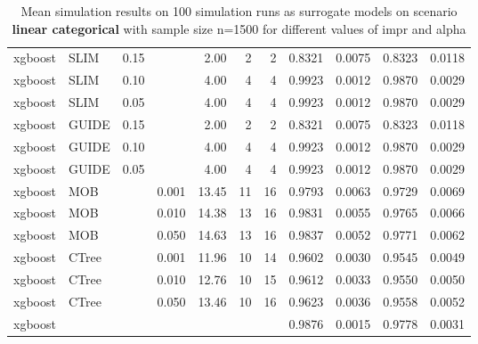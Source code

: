 \begin{table}[!htb]
\begin{tabular}[t]{l|l|r|r|r|r|r|r|r|r|r}
xgboost & SLIM & 0.15 & & 2.00 & 2 & 2 & 0.8321 & 0.0075 & 0.8323 & 0.0118\\
xgboost & SLIM & 0.10 & & 4.00 & 4 & 4 & 0.9923 & 0.0012 & 0.9870 & 0.0029\\
xgboost & SLIM & 0.05 & & 4.00 & 4 & 4 & 0.9923 & 0.0012 & 0.9870 & 0.0029\\
xgboost & GUIDE & 0.15 & & 2.00 & 2 & 2 & 0.8321 & 0.0075 & 0.8323 & 0.0118\\
xgboost & GUIDE & 0.10 & & 4.00 & 4 & 4 & 0.9923 & 0.0012 & 0.9870 & 0.0029\\
xgboost & GUIDE & 0.05 & & 4.00 & 4 & 4 & 0.9923 & 0.0012 & 0.9870 & 0.0029\\
xgboost & MOB & & 0.001 & 13.45 & 11 & 16 & 0.9793 & 0.0063 & 0.9729 & 0.0069\\
xgboost & MOB & & 0.010 & 14.38 & 13 & 16 & 0.9831 & 0.0055 & 0.9765 & 0.0066\\
xgboost & MOB & & 0.050 & 14.63 & 13 & 16 & 0.9837 & 0.0052 & 0.9771 & 0.0062\\
xgboost & CTree & & 0.001 & 11.96 & 10 & 14 & 0.9602 & 0.0030 & 0.9545 & 0.0049\\
xgboost & CTree & & 0.010 & 12.76 & 10 & 15 & 0.9612 & 0.0033 & 0.9550 & 0.0050\\
xgboost & CTree & & 0.050 & 13.46 & 10 & 16 & 0.9623 & 0.0036 & 0.9558 & 0.0052\\
\hline
xgboost & & & & & & & 0.9876 & 0.0015 & 0.9778 & 0.0031\\
\hline
\end{tabular}
\label{tab:app_linear_abrupt_1000}
\caption{Mean simulation results on 100 simulation runs as surrogate models  on scenario \textbf{linear categorical} with sample size n=1500 for different values of impr and alpha}

\end{table}



